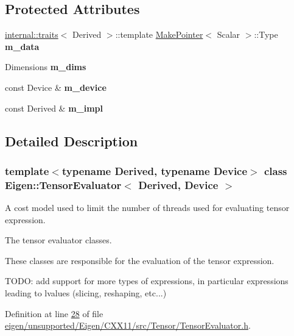 \subsection*{Protected Attributes}
\begin{DoxyCompactItemize}
\item 
\mbox{\label{struct_eigen_1_1_tensor_evaluator_a797b5bb449f498ef7b1fbc42eb3fe906}} 
\hyperlink{struct_eigen_1_1internal_1_1traits}{internal\+::traits}$<$ Derived $>$\+::template \hyperlink{struct_eigen_1_1_make_pointer}{Make\+Pointer}$<$ Scalar $>$\+::Type {\bfseries m\+\_\+data}
\item 
\mbox{\label{struct_eigen_1_1_tensor_evaluator_a4dd80cef8c2ef13f419d3f1c4d1ea198}} 
Dimensions {\bfseries m\+\_\+dims}
\item 
\mbox{\label{struct_eigen_1_1_tensor_evaluator_a789d262977d5c888be499c46f15a046a}} 
const Device \& {\bfseries m\+\_\+device}
\item 
\mbox{\label{struct_eigen_1_1_tensor_evaluator_a12c735d2007c8114a11c92fc83762f02}} 
const Derived \& {\bfseries m\+\_\+impl}
\end{DoxyCompactItemize}


\subsection{Detailed Description}
\subsubsection*{template$<$typename Derived, typename Device$>$\newline
class Eigen\+::\+Tensor\+Evaluator$<$ Derived, Device $>$}

A cost model used to limit the number of threads used for evaluating tensor expression. 

The tensor evaluator classes.

These classes are responsible for the evaluation of the tensor expression.

T\+O\+DO\+: add support for more types of expressions, in particular expressions leading to lvalues (slicing, reshaping, etc...) 

Definition at line \hyperlink{eigen_2unsupported_2_eigen_2_c_x_x11_2src_2_tensor_2_tensor_evaluator_8h_source_l00028}{28} of file \hyperlink{eigen_2unsupported_2_eigen_2_c_x_x11_2src_2_tensor_2_tensor_evaluator_8h_source}{eigen/unsupported/\+Eigen/\+C\+X\+X11/src/\+Tensor/\+Tensor\+Evaluator.\+h}.



